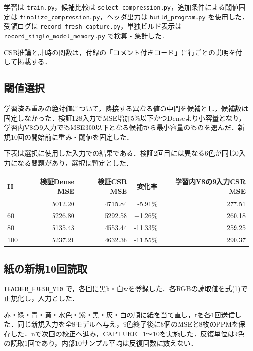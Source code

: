 \documentclass[
  10pt,
  a4paper,
]{article}
\begin{document}
学習は \texttt{train.py}，候補比較は
\texttt{select\_compression.py}，追加条件による閾値固定は
\texttt{finalize\_compression.py}，ヘッダ出力は
\texttt{build\_program.py} を使用した．受領ログは
\texttt{record\_fresh\_capture.py}，単独ビルド表示は
\texttt{record\_single\_model\_memory.py} で検算・集計した．

CSR推論と計時の関数は，付録の「コメント付きコード」に行ごとの説明を付して掲載する．

\subsection{閾値選択}\label{ux95beux5024ux9078ux629e}

学習済み重みの絶対値について，隣接する異なる値の中間を候補とし，候補数は固定しなかった．検証128入力でMSE増加5\%以下かつDenseより小容量となり，学習内V8の9入力でもMSE300以下となる候補から最小容量のものを選んだ．新規10回の開始前に重み・閾値を固定した．

下表は選択に使用した入力での結果である．検証2回目には異なる6色が同じ0入力になる問題があり，選択は暫定とした．

\begin{longtable}[]{@{}lrrrr@{}}
\toprule\noalign{}
H & 検証Dense MSE & 検証CSR MSE & 変化率 & 学習内V8の9入力CSR MSE \\
\midrule\noalign{}
\endhead
\bottomrule\noalign{}
\endlastfoot
40 & 5012.20 & 4715.84 & -5.91\% & 277.51 \\
60 & 5226.80 & 5292.58 & +1.26\% & 260.18 \\
80 & 5135.43 & 4553.44 & -11.33\% & 259.25 \\
100 & 5237.21 & 4632.38 & -11.55\% & 290.37 \\
\end{longtable}

\subsection{紙の新規10回読取}\label{ux7d19ux306eux65b0ux898f10ux56deux8aadux53d6}

\texttt{TEACHER\_FRESH\_V10}
で，各回に黒b・白wを登録した．各RGBの読取値を式\hyperref[eq:normalization]{(1)}で正規化し，入力とした．

赤・緑・青・黄・水色・紫・黒・灰・白の順に紙を当て直し，rを各1回送信した．同じ新規入力を全8モデルへ与え，9色終了後に8個のMSEと8枚のPPMを保存した．nで次回の校正へ進み，CAPTURE=1〜10を実施した．反復単位は9色の読取1回であり，内部10サンプル平均は反復回数に数えない．
\end{document}
